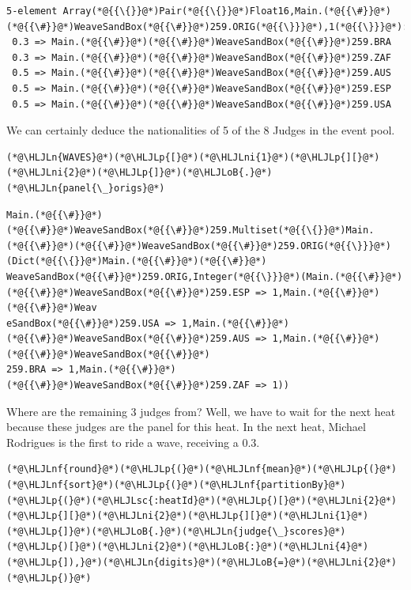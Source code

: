 \documentclass[12pt,a4paper]{article}
\newcommand{\HLJLn}[1]{#1}
\newcommand{\HLJLnf}[1]{\textcolor[RGB]{66,102,213}{#1}}
\newcommand{\HLJLsc}[1]{\textcolor[RGB]{201,61,57}{#1}}
\newcommand{\HLJLni}[1]{\textcolor[RGB]{59,151,46}{#1}}
\newcommand{\HLJLoB}[1]{\textcolor[RGB]{102,102,102}{\textbf{#1}}}
\newcommand{\HLJLp}[1]{#1}
\begin{document}
\begin{lstlisting}
5-element Array(*@{{\{}}@*)Pair(*@{{\{}}@*)Float16,Main.(*@{{\#}}@*)(*@{{\#}}@*)WeaveSandBox(*@{{\#}}@*)259.ORIG(*@{{\}}}@*),1(*@{{\}}}@*):
 0.3 => Main.(*@{{\#}}@*)(*@{{\#}}@*)WeaveSandBox(*@{{\#}}@*)259.BRA
 0.3 => Main.(*@{{\#}}@*)(*@{{\#}}@*)WeaveSandBox(*@{{\#}}@*)259.ZAF
 0.5 => Main.(*@{{\#}}@*)(*@{{\#}}@*)WeaveSandBox(*@{{\#}}@*)259.AUS
 0.5 => Main.(*@{{\#}}@*)(*@{{\#}}@*)WeaveSandBox(*@{{\#}}@*)259.ESP
 0.5 => Main.(*@{{\#}}@*)(*@{{\#}}@*)WeaveSandBox(*@{{\#}}@*)259.USA
\end{lstlisting}


We can certainly deduce the nationalities of 5 of the 8 Judges in the event pool.


\begin{lstlisting}
(*@\HLJLn{WAVES}@*)(*@\HLJLp{[}@*)(*@\HLJLni{1}@*)(*@\HLJLp{][}@*)(*@\HLJLni{2}@*)(*@\HLJLp{]}@*)(*@\HLJLoB{.}@*)(*@\HLJLn{panel{\_}origs}@*)
\end{lstlisting}

\begin{lstlisting}
Main.(*@{{\#}}@*)(*@{{\#}}@*)WeaveSandBox(*@{{\#}}@*)259.Multiset(*@{{\{}}@*)Main.(*@{{\#}}@*)(*@{{\#}}@*)WeaveSandBox(*@{{\#}}@*)259.ORIG(*@{{\}}}@*)(Dict(*@{{\{}}@*)Main.(*@{{\#}}@*)(*@{{\#}}@*)
WeaveSandBox(*@{{\#}}@*)259.ORIG,Integer(*@{{\}}}@*)(Main.(*@{{\#}}@*)(*@{{\#}}@*)WeaveSandBox(*@{{\#}}@*)259.ESP => 1,Main.(*@{{\#}}@*)(*@{{\#}}@*)Weav
eSandBox(*@{{\#}}@*)259.USA => 1,Main.(*@{{\#}}@*)(*@{{\#}}@*)WeaveSandBox(*@{{\#}}@*)259.AUS => 1,Main.(*@{{\#}}@*)(*@{{\#}}@*)WeaveSandBox(*@{{\#}}@*)
259.BRA => 1,Main.(*@{{\#}}@*)(*@{{\#}}@*)WeaveSandBox(*@{{\#}}@*)259.ZAF => 1))
\end{lstlisting}


Where are the remaining 3 judges from? Well, we have to wait for the next heat because these judges are the panel for this heat. In the next heat, Michael Rodrigues is the first to ride a wave, receiving a 0.3.


\begin{lstlisting}
(*@\HLJLnf{round}@*)(*@\HLJLp{(}@*)(*@\HLJLnf{mean}@*)(*@\HLJLp{(}@*)(*@\HLJLnf{sort}@*)(*@\HLJLp{(}@*)(*@\HLJLnf{partitionBy}@*)(*@\HLJLp{(}@*)(*@\HLJLsc{:heatId}@*)(*@\HLJLp{)[}@*)(*@\HLJLni{2}@*)(*@\HLJLp{][}@*)(*@\HLJLni{2}@*)(*@\HLJLp{][}@*)(*@\HLJLni{1}@*)(*@\HLJLp{]}@*)(*@\HLJLoB{.}@*)(*@\HLJLn{judge{\_}scores}@*)(*@\HLJLp{)[}@*)(*@\HLJLni{2}@*)(*@\HLJLoB{:}@*)(*@\HLJLni{4}@*)(*@\HLJLp{]),}@*)(*@\HLJLn{digits}@*)(*@\HLJLoB{=}@*)(*@\HLJLni{2}@*)(*@\HLJLp{)}@*)
\end{lstlisting}
\end{document}
